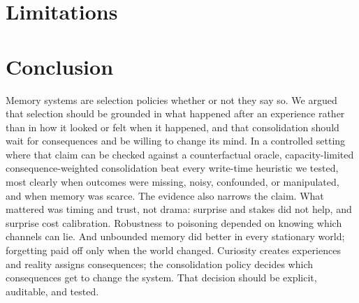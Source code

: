 \documentclass[11pt]{article}
\begin{document}


\section{Limitations}
\label{sec:limits}


\section{Conclusion}
Memory systems are selection policies whether or not they say so. We argued that selection should be grounded in what happened after an experience rather than in how it looked or felt when it happened, and that consolidation should wait for consequences and be willing to change its mind. In a controlled setting where that claim can be checked against a counterfactual oracle, capacity-limited consequence-weighted consolidation beat every write-time heuristic we tested, most clearly when outcomes were missing, noisy, confounded, or manipulated, and when memory was scarce. The evidence also narrows the claim. What mattered was timing and trust, not drama: surprise and stakes did not help, and surprise cost calibration. Robustness to poisoning depended on knowing which channels can lie. And unbounded memory did better in every stationary world; forgetting paid off only when the world changed. Curiosity creates experiences and reality assigns consequences; the consolidation policy decides which consequences get to change the system. That decision should be explicit, auditable, and tested.




\appendix

\end{document}
